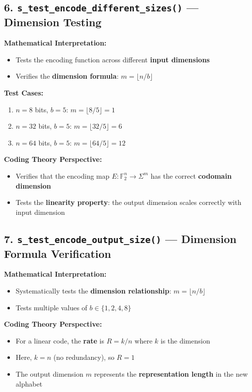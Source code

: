 \documentclass[11pt,a4paper]{article}
\begin{document}
\subsection{6. \texttt{s\_test\_encode\_different\_sizes()} --- Dimension Testing}

\textbf{Mathematical Interpretation:}
\begin{itemize}
\item Tests the encoding function across different \textbf{input dimensions}
\item Verifies the \textbf{dimension formula}: $m = \lfloor n/b \rfloor$
\end{itemize}

\textbf{Test Cases:}
\begin{enumerate}
\item $n = 8$ bits, $b = 5$: $m = \lfloor 8/5 \rfloor = 1$
\item $n = 32$ bits, $b = 5$: $m = \lfloor 32/5 \rfloor = 6$
\item $n = 64$ bits, $b = 5$: $m = \lfloor 64/5 \rfloor = 12$
\end{enumerate}

\textbf{Coding Theory Perspective:}
\begin{itemize}
\item Verifies that the encoding map $E: \mathbb{F}_2^n \rightarrow \Sigma^m$ has the correct \textbf{codomain dimension}
\item Tests the \textbf{linearity property}: the output dimension scales correctly with input dimension
\end{itemize}

\subsection{7. \texttt{s\_test\_encode\_output\_size()} --- Dimension Formula Verification}

\textbf{Mathematical Interpretation:}
\begin{itemize}
\item Systematically tests the \textbf{dimension relationship}: $m = \lfloor n/b \rfloor$
\item Tests multiple values of $b \in \{1, 2, 4, 8\}$
\end{itemize}

\textbf{Coding Theory Perspective:}
\begin{itemize}
\item For a linear code, the \textbf{rate} is $R = k/n$ where $k$ is the dimension
\item Here, $k = n$ (no redundancy), so $R = 1$
\item The output dimension $m$ represents the \textbf{representation length} in the new alphabet
\end{itemize}
\end{document}
